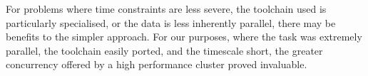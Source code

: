 For problems where time constraints are less severe, the toolchain used is particularly specialised, or the data is less inherently parallel, there may be benefits to the simpler approach.  For our purposes, where the task was extremely parallel, the toolchain easily ported, and the timescale short, the greater concurrency offered by a high performance cluster proved invaluable.










% 
% 
% 
% 
% 
% 
% 
% 
